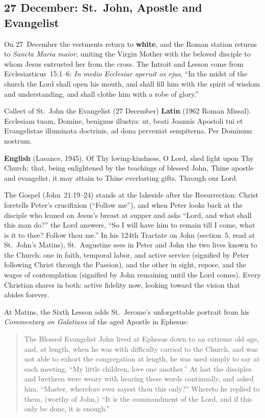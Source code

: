\subsection{27 December: St.~John, Apostle and Evangelist}

On 27~December the vestments return to \textbf{white}, and the Roman station
returns to \textit{Sancta Maria maior}, uniting the Virgin Mother with the
beloved disciple to whom Jesus entrusted her from the cross. The Introit and
Lesson come from Ecclesiasticus~15:1--6: \textit{In medio Ecclesiae aperuit os
ejus}, ``In the midst of the church the Lord shall open his mouth, and shall
fill him with the spirit of wisdom and understanding, and shall clothe him with
a robe of glory.''

\begin{massbox}{Collect of St.~John the Evangelist (27 December)}
\textbf{Latin} (1962 Roman Missal). Ecclesiam tuam, Domine, benignus illustra:
ut, beati Joannis Apostoli tui et Evangelistae illuminata doctrinis, ad dona
perveniat sempiterna. Per Dominum nostrum.

\textbf{English} (Lasance, 1945). Of Thy loving-kindness, O Lord, shed light
upon Thy Church; that, being enlightened by the teachings of blessed John, Thine
apostle and evangelist, it may attain to Thine everlasting gifts. Through our
Lord.
\end{massbox}

The Gospel (John~21:19--24) stands at the lakeside after the Resurrection:
Christ foretells Peter's crucifixion (``Follow me''), and when Peter looks back
at the disciple who leaned on Jesus's breast at supper and asks ``Lord, and what
shall this man do?'' the Lord answers, ``So I will have him to remain till I
come, what is it to thee? Follow thou me.'' In his 124th Tractate on John
(section~5, read at St.~John's Matins), St.~Augustine sees in Peter and John the
two lives known to the Church: one in faith, temporal labor, and active service
(signified by Peter following Christ through the Passion), and the other in
sight, repose, and the wages of contemplation (signified by John remaining until
the Lord comes). Every Christian shares in both: active fidelity now, looking
toward the vision that abides forever.

At Matins, the Sixth Lesson adds St.~Jerome's unforgettable portrait from his
\textit{Commentary on Galatians} of the aged Apostle in Ephesus:

\begin{quote}
The Blessed Evangelist John lived at Ephesus down to an extreme old age, and, at
length, when he was with difficulty carried to the Church, and was not able to
exhort the congregation at length, he was used simply to say at each meeting,
``My little children, love one another.'' At last the disciples and brethren
were weary with hearing these words continually, and asked him, ``Master,
wherefore ever sayest thou this only?'' Whereto he replied to them, (worthy of
John,) ``It is the commandment of the Lord, and if this only be done, it is
enough.''
\end{quote}

